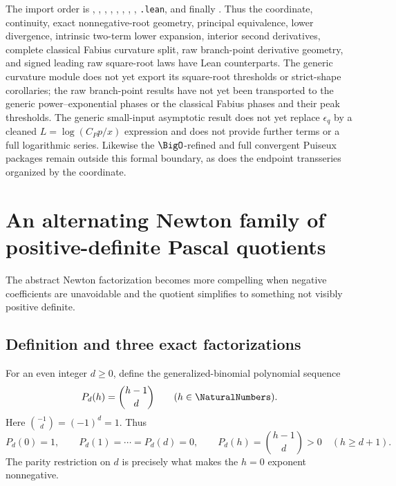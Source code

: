 \documentclass[11pt,oneside]{article}
\numberwithin{equation}{section}
\theoremstyle{definition}
\theoremstyle{remark}
\begin{document}
The import order is
,
,
,
,
,
,
,
,
\texttt{.lean}, and finally
.
Thus the coordinate, continuity, exact nonnegative-root geometry, principal
equivalence, lower divergence, intrinsic two-term lower expansion, interior
second derivatives, complete classical Fabius curvature split, raw
branch-point derivative geometry, and signed leading raw square-root laws
have Lean counterparts.
The generic curvature module does not yet export its square-root thresholds
or strict-shape corollaries; the raw branch-point results have not yet been
transported to the generic power--exponential phases or the classical Fabius
phases and their peak thresholds.  The generic small-input asymptotic result does not yet
replace \(\epsilon_q\) by a cleaned \(L=\log(C_Pp/x)\) expression and does
not provide further terms or a full logarithmic series.  Likewise the
\(\BigO\)-refined and full convergent Puiseux packages remain outside this
formal boundary, as does the endpoint transseries organized by the
coordinate.


\section{An alternating Newton family of positive-definite Pascal quotients}
\label{p1:sec:alternating-family}

The abstract Newton factorization becomes more compelling when negative coefficients are
unavoidable and the quotient simplifies to something not visibly positive definite.

\subsection{Definition and three exact factorizations}

For an even integer $d\ge0$, define the generalized-binomial polynomial sequence
\begin{equation}
 P_d(h)=\binom{h-1}{d}
 \qquad(h\in\NaturalNumbers).
 \label{p1:eq:Pd-def}
\end{equation}
Here $\binom{-1}{d}=(-1)^d=1$.  Thus
\begin{equation}
 P_d(0)=1,
 \qquad
 P_d(1)=\cdots=P_d(d)=0,
 \qquad
 P_d(h)=\binom{h-1}{d}>0\quad(h\ge d+1).
 \label{p1:eq:Pd-nonnegative}
\end{equation}
The parity restriction on $d$ is precisely what makes the $h=0$ exponent nonnegative.
\end{document}
